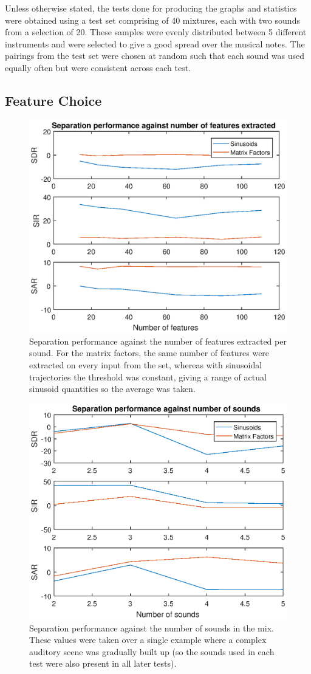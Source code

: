 \documentclass[10pt,twoside,a4paper]{report}
\begin{document}
Unless otherwise stated, the tests done for producing the graphs and statistics were obtained using a test set comprising of 40 mixtures, each with two sounds from a selection of 20. These samples were evenly distributed between 5 different instruments and were selected to give a good spread over the musical notes. The pairings from the test set were chosen at random such that each sound was used equally often but were consistent across each test.

\subsection{Feature Choice}


\begin{figure}
\centering
\includegraphics[width=0.7\linewidth]{./FeatureCompPlot}
\caption{Separation performance against the number of features extracted per sound. For the matrix factors, the same number of features were extracted on every input from the set, whereas with sinusoidal trajectories the threshold was constant, giving a range of actual sinusoid quantities so the average was taken.}
\label{fig:FeatureCompPlot}
\end{figure}

\begin{figure}
\centering
\includegraphics[width=0.7\linewidth]{./FeatureKGraph}
\caption{Separation performance against the number of sounds in the mix. These values were taken over a single example where a complex auditory scene was gradually built up (so the sounds used in each test were also present in all later tests).}
\label{fig:FeatureKGraph}
\end{figure}
\end{document}
